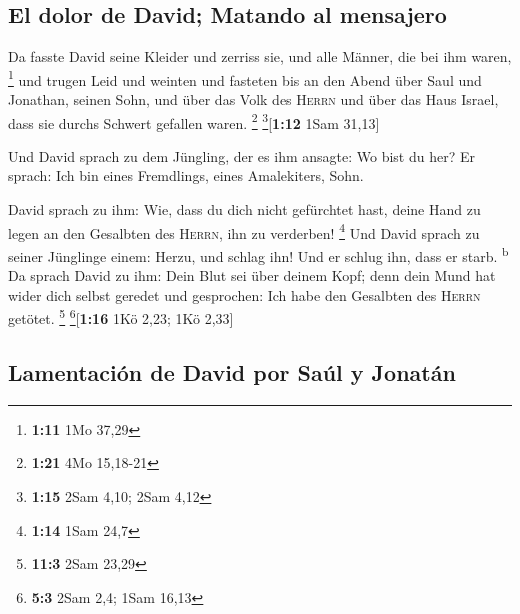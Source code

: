 \hypertarget{el-dolor-de-david-matando-al-mensajero}{%
\subsection{El dolor de David; Matando al
mensajero}\label{el-dolor-de-david-matando-al-mensajero}}

 Da fasste David seine Kleider und zerriss sie, und alle
Männer, die bei ihm waren, \footnote{\textbf{1:11} 1Mo 37,29}
 und trugen Leid und weinten und fasteten bis an den
Abend über Saul und Jonathan, seinen Sohn, und über das Volk des
\textsc{Herrn} und über das Haus Israel, dass sie durchs Schwert
gefallen waren. \footnote{\textbf{1:21} 4Mo 15,18-21}
\footnote{\textbf{1:15} 2Sam 4,10; 2Sam 4,12}{[}\textbf{1:12} 1Sam
31,13{]}

 Und David sprach zu dem Jüngling, der es ihm ansagte: Wo
bist du her? Er sprach: Ich bin eines Fremdlings, eines Amalekiters,
Sohn.

 David sprach zu ihm: Wie, dass du dich nicht gefürchtet
hast, deine Hand zu legen an den Gesalbten des \textsc{Herrn}, ihn zu
verderben! \footnote{\textbf{1:14} 1Sam 24,7}  Und David
sprach zu seiner Jünglinge einem: Herzu, und schlag ihn! Und er schlug
ihn, dass er starb. \textsuperscript{b}  Da sprach David
zu ihm: Dein Blut sei über deinem Kopf; denn dein Mund hat wider dich
selbst geredet und gesprochen: Ich habe den Gesalbten des \textsc{Herrn}
getötet. \footnote{\textbf{11:3} 2Sam 23,29} \footnote{\textbf{5:3} 2Sam
  2,4; 1Sam 16,13}{[}\textbf{1:16} 1Kö 2,23; 1Kö 2,33{]}

\hypertarget{lamentaciuxf3n-de-david-por-sauxfal-y-jonatuxe1n}{%
\subsection{Lamentación de David por Saúl y
Jonatán}\label{lamentaciuxf3n-de-david-por-sauxfal-y-jonatuxe1n}}

